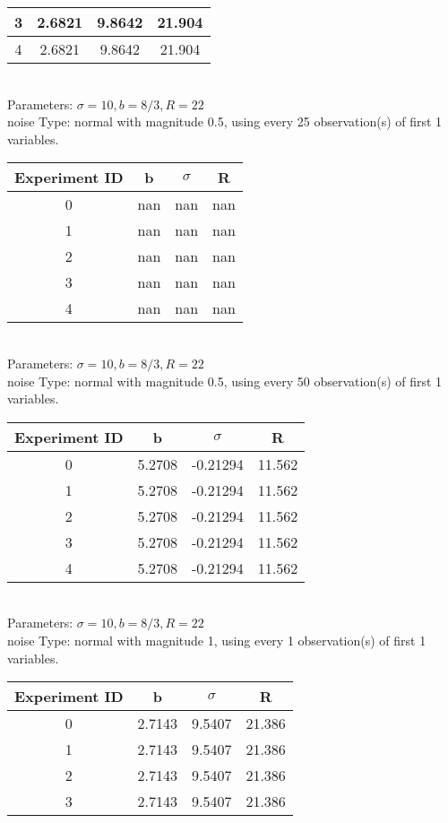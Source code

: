 \begin{multicols}{3}
\begin{tabular}{cccc}
 3 & 2.6821 & 9.8642 & 21.904\\ \hline 
 4 & 2.6821 & 9.8642 & 21.904\\ \hline 
 \end{tabular}\\
Parameters: $\sigma=10, b=8/3, R=22$\\
noise Type: normal with magnitude 0.5, using every 25 observation(s) of first 1 variables.\\
\begin{tabular}{cccc}
\hline Experiment ID & b & $\sigma$ & R \\ \hline 
0 & nan & nan & nan\\ \hline 
 1 & nan & nan & nan\\ \hline 
 2 & nan & nan & nan\\ \hline 
 3 & nan & nan & nan\\ \hline 
 4 & nan & nan & nan\\ \hline 
 \end{tabular}\\
Parameters: $\sigma=10, b=8/3, R=22$\\
noise Type: normal with magnitude 0.5, using every 50 observation(s) of first 1 variables.\\
\begin{tabular}{cccc}
\hline Experiment ID & b & $\sigma$ & R \\ \hline 
0 & 5.2708 & -0.21294 & 11.562\\ \hline 
 1 & 5.2708 & -0.21294 & 11.562\\ \hline 
 2 & 5.2708 & -0.21294 & 11.562\\ \hline 
 3 & 5.2708 & -0.21294 & 11.562\\ \hline 
 4 & 5.2708 & -0.21294 & 11.562\\ \hline 
 \end{tabular}\\
Parameters: $\sigma=10, b=8/3, R=22$\\
noise Type: normal with magnitude 1, using every 1 observation(s) of first 1 variables.\\
\begin{tabular}{cccc}
\hline Experiment ID & b & $\sigma$ & R \\ \hline 
0 & 2.7143 & 9.5407 & 21.386\\ \hline 
 1 & 2.7143 & 9.5407 & 21.386\\ \hline 
 2 & 2.7143 & 9.5407 & 21.386\\ \hline 
 3 & 2.7143 & 9.5407 & 21.386\\ \hline 

\end{tabular}
\end{multicols}
